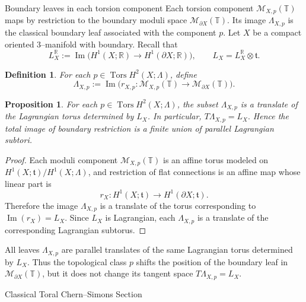 \documentclass[12pt]{amsart}
\makeatletter
\renewcommand\subsection{\@startsection{subsection}{2}%
  \z@{.5\linespacing\@plus.7\linespacing}{-.5em}%
  {\normalfont\bfseries}}
\numberwithin{equation}{section}
\newtheorem{prop}[theorem]{Proposition}
\newtheorem{definition}[theorem]{Definition}
\DeclareMathOperator{\Tors}{Tors}
\makeatother
\begin{document}
\subsection{Boundary leaves in each torsion component} Each torsion component \(\mathcal M_{X,p}(\mathbb T)\) maps by restriction to the boundary moduli space \(\mathcal M_{\partial X}(\mathbb T)\). Its image \(\Lambda_{X,p}\) is the classical boundary leaf associated with the component
\(p\). Let $X$ be a compact oriented $3$--manifold with boundary. Recall that
\[
L_X^{\mathbb R}
:=
\operatorname{Im}\!\bigl(H^1(X;\mathbb R)\to H^1(\partial X;\mathbb R)\bigr),
\qquad
L_X=L_X^{\mathbb R}\otimes \mathfrak t.
\]

\begin{definition}
\label{def:torsion-component-boundary-leaf}
For each $p\in \Tors H^2(X;\Lambda)$, define
\[
\Lambda_{X,p}
:=
\operatorname{Im}\!\bigl(
r_{X,p}:\mathcal M_{X,p}(\mathbb T)\to \mathcal M_{\partial X}(\mathbb T)
\bigr).
\]
\end{definition}

\begin{prop}
\label{prop:Componentwise-boundary-leaf-geometry}
For each $p\in\Tors H^2(X;\Lambda)$, the subset $\Lambda_{X,p}$ is a translate
of the Lagrangian torus determined by $L_X$. In particular, $T\Lambda_{X,p}=L_X.$ Hence the total image of boundary restriction is a finite union of parallel
Lagrangian subtori.
\end{prop}

\begin{proof}
Each moduli component $\mathcal M_{X,p}(\mathbb T)$ is an affine torus modeled
on $H^1(X;\mathfrak t)/H^1(X;\Lambda)$, and restriction of flat connections is
an affine map whose linear part is
\[
r_X:H^1(X;\mathfrak t)\to H^1(\partial X;\mathfrak t).
\]
Therefore the image $\Lambda_{X,p}$ is a translate of the torus corresponding
to $\operatorname{Im}(r_X)=L_X$.
Since $L_X$ is Lagrangian, each $\Lambda_{X,p}$ is a translate of the corresponding Lagrangian subtorus.
\end{proof}

All leaves \(\Lambda_{X,p}\) are parallel translates of the same Lagrangian torus determined by \(L_X\). Thus the topological class \(p\) shifts the
position of the boundary leaf in
\(\mathcal M_{\partial X}(\mathbb T)\), but it does not change its tangent
space \(T\Lambda_{X,p}=L_X\).


\subsection{Classical Toral Chern--Simons Section}
\end{document}
